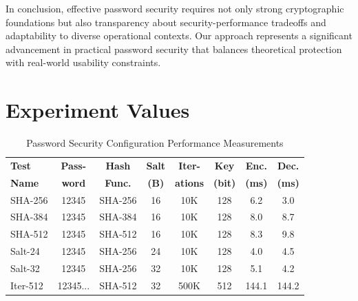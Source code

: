 \documentclass[11pt,a4paper]{article}
\begin{document}
In conclusion, effective password security requires not only strong cryptographic foundations but also transparency about security-performance tradeoffs and adaptability to diverse operational contexts. Our approach represents a significant advancement in practical password security that balances theoretical protection with real-world usability constraints.
\appendix
\section{Experiment Values}
\label{sec:table-values}
\begin{table}[htbp]
  \centering
  \caption{Password Security Configuration Performance Measurements}
  \label{tab:password-security}
  \setlength{\tabcolsep}{4pt}  %
  \small  %
  \begin{tabular}{|l|c|c|c|c|c|c|c|}
  \hline
  \textbf{Test} & \textbf{Pass-} & \textbf{Hash} & \textbf{Salt} & \textbf{Iter-} & \textbf{Key} & \textbf{Enc.} & \textbf{Dec.} \\
  \textbf{Name} & \textbf{word} & \textbf{Func.} & \textbf{(B)} & \textbf{ations} & \textbf{(bit)} & \textbf{(ms)} & \textbf{(ms)} \\
  \hline
  SHA-256 & 12345 & SHA-256 & 16 & 10K & 128 & 6.2 & 3.0 \\
  SHA-384 & 12345 & SHA-384 & 16 & 10K & 128 & 8.0 & 8.7 \\
  SHA-512 & 12345 & SHA-512 & 16 & 10K & 128 & 8.3 & 9.8 \\
  Salt-24 & 12345 & SHA-256 & 24 & 10K & 128 & 4.0 & 4.5 \\
  Salt-32 & 12345 & SHA-256 & 32 & 10K & 128 & 5.1 & 4.2 \\
  Iter-512 & 12345... & SHA-512 & 32 & 500K & 512 & 144.1 & 144.2 \\
  \hline
  \end{tabular}
  \end{table}


\end{document}
